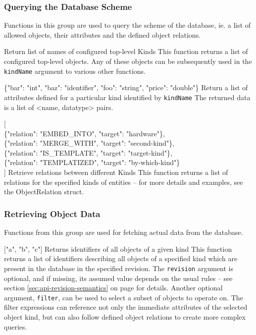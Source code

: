 \documentclass{article}
\begin{document}
\subsubsection{Querying the Database Scheme}
\label{sec:api-group-dbscheme}

Functions in this group are used to query the scheme of the database, ie. a list of allowed objects, their attributes
and the defined object relations.

    {Return list of names of configured top-level Kinds}
    {This function returns a list of configured top-level objects.  Any of these objects can be subsequently used in the
    {\tt kindName} argument to various other functions.  \deskaUnsortedRes}

    {\{"bar": "int", "baz": "identifier", "foo": "string", "price": "double"\}}
    {Return a list of attributes defined for a particular kind identified by {\tt kindName}}
    {The returned data is a list of \textless name, datatype\textgreater { }pairs.  \deskaUnsortedRes}

    { [ \\
            \{"relation": "EMBED\_INTO", "target": "hardware"\}, \\
            \{"relation": "MERGE\_WITH", "target": "second-kind"\}, \\
            \{"relation": "IS\_TEMPLATE", "target": "target-kind"\}, \\
            \{"relation": "TEMPLATIZED", "target": "by-which-kind"\} \\
            ]}
    {Retrieve relations between different Kinds}
    {This function returns a list of relations for the specified kinds of entities -- for more details and examples, see
    the ObjectRelation struct.  \deskaUnsortedRes}

\subsubsection{Retrieving Object Data}
\label{sec:api-group-data-retrieval}

Functions from this group are used for fetching actual data from the database.

    { ["a", "b", "c"] }
    {Returns identifiers of all objects of a given kind}
    {This function returns a list of identifiers describing all objects of a specified kind which are present in the
    database in the specified revision.  The {\tt revision} argument is optional, and if missing, its assumed value
    depends on the usual rules -- see section \ref{sec:api-revision-semantics} on page
    \pageref{sec:api-revision-semantics} for details.  Another optional argument, {\tt filter}, can be used to select
    a subset of objects to operate on.  The filter expressions can reference not only the immediate attributes of the
    selected object kind, but can also follow defined object relations to create more complex queries.  \deskaUnsortedRes}
\end{document}
